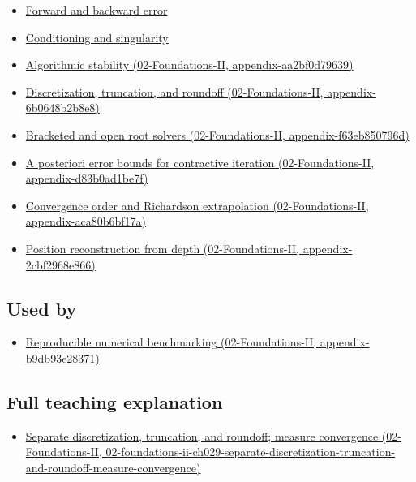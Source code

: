 \begin{itemize}
\tightlist
\item
  \hyperref[appendix-a7fbaf6d1b1c]{Forward and backward error}
\item
  \hyperref[appendix-8f6a01f284a7]{Conditioning and singularity}
\item
  \href{../02-Foundations-II/main.pdf\#nameddest=appendix-aa2bf0d79639}{Algorithmic stability (02-Foundations-II, appendix-aa2bf0d79639)}
\item
  \href{../02-Foundations-II/main.pdf\#nameddest=appendix-6b0648b2b8e8}{Discretization, truncation, and roundoff (02-Foundations-II, appendix-6b0648b2b8e8)}
\item
  \href{../02-Foundations-II/main.pdf\#nameddest=appendix-f63eb850796d}{Bracketed and open root solvers (02-Foundations-II, appendix-f63eb850796d)}
\item
  \href{../02-Foundations-II/main.pdf\#nameddest=appendix-d83b0ad1be7f}{A posteriori error bounds for contractive iteration (02-Foundations-II, appendix-d83b0ad1be7f)}
\item
  \href{../02-Foundations-II/main.pdf\#nameddest=appendix-aca80b6bf17a}{Convergence order and Richardson extrapolation (02-Foundations-II, appendix-aca80b6bf17a)}
\item
  \href{../02-Foundations-II/main.pdf\#nameddest=appendix-2cbf2968e866}{Position reconstruction from depth (02-Foundations-II, appendix-2cbf2968e866)}
\end{itemize}

\subsection{Used by}\label{appendix-31b8c295e05f-used-by}

\begin{itemize}
\tightlist
\item
  \href{../02-Foundations-II/main.pdf\#nameddest=appendix-b9db93e28371}{Reproducible numerical benchmarking (02-Foundations-II, appendix-b9db93e28371)}
\end{itemize}

\subsection{Full teaching explanation}\label{appendix-31b8c295e05f-full-teaching-explanation}

\begin{itemize}
\tightlist
\item
  \href{../02-Foundations-II/main.pdf\#nameddest=02-foundations-ii-ch029-separate-discretization-truncation-and-roundoff-measure-convergence}{Separate discretization, truncation, and roundoff; measure convergence (02-Foundations-II, 02-foundations-ii-ch029-separate-discretization-truncation-and-roundoff-measure-convergence)}
\end{itemize}

